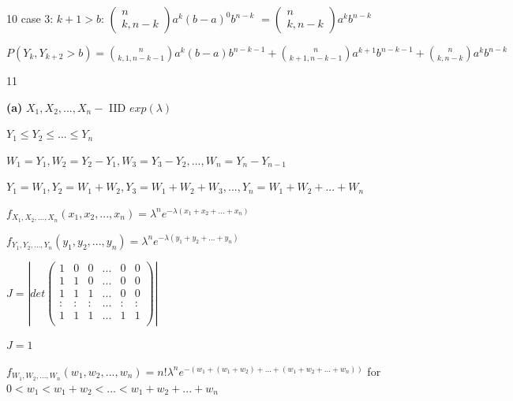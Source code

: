 \documentclass[12 pt]{article}
\begin{document}
\begin{exercise}{10}
    case 3: $k+1 > b$: $\begin{pmatrix}
        n \\
        k, n-k
    \end{pmatrix} a^k (b-a)^0 b^{n-k}$
    $= \begin{pmatrix}
        n \\
        k, n-k
    \end{pmatrix} a^k b^{n-k}$

    \hfill

    $P(Y_k, Y_{k+2} > b) = \binom{n}{k, 1, n-k-1}a^k (b-a) b^{n-k-1} + \binom{n}{k+1, n-k-1} a^{k+1} b^{n-k-1} + \binom{n}{k, n-k} a^k b^{n-k}$

    \hfill
    \end{exercise}



    \begin{exercise}{11}
    \hfill

    \textbf{(a)} $X_1, X_2, ..., X_n -$ IID $exp(\lambda)$

    $Y_1 \leq Y_2 \leq ... \leq Y_n$

    $W_1 = Y_1, W_2 = Y_2 - Y_1, W_3 = Y_3 - Y_2, ..., W_n = Y_n - Y_{n-1}$

    $Y_1 = W_1, Y_2 = W_1 + W_2, Y_3 = W_1 + W_2 + W_3, ..., Y_n = W_1 + W_2 + ... + W_n$

    \hfill

    $f_{X_1, X_2, ..., X_n}(x_1, x_2, ..., x_n) = {\lambda}^n e^{- \lambda(x_1 + x_2 + ... + x_n)}$

    $f_{Y_1, Y_2, ..., Y_n}(y_1, y_2, ..., y_n) = {\lambda}^n e^{- \lambda(y_1 + y_2 + ... + y_n)}$

    $J = | det \begin{pmatrix}
        1 & 0 & 0 & ... & 0 & 0 \\
        1 & 1 & 0 & ... & 0 & 0 \\
        1 & 1 & 1 & ... & 0 & 0 \\
        : & : & : & ... & : & : \\
        1 & 1 & 1 & ... & 1 & 1 \\
    \end{pmatrix}|$

    $J = 1$

    \hfill

    $f_{W_1, W_2, ..., W_n}(w_1, w_2, ..., w_n) = n!{\lambda}^n e^{-(w_1 + (w_1 + w_2) + ... + (w_1 + w_2 + ... + w_n))}$ for $0 < w_1 < w_1 + w_2 < ... < w_1 + w_2 + ... + w_n$


\end{exercise}
\end{document}
